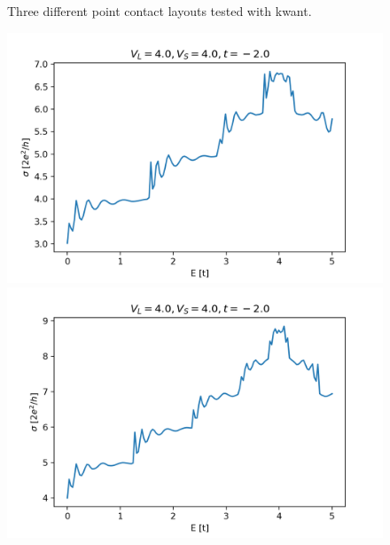 \documentclass[12pt]{article}
\numberwithin{equation}{section}
\begin{document}
\begin{figure}
\begin{minipage}{0.333\textwidth}
  \end{minipage}
  \caption{Three different point contact layouts tested with kwant.}
\end{figure}


\newpage
\begin{figure}
  \centering
  \begin{minipage}{0.333\textwidth}
      \centering
      \includegraphics[width=1.0\textwidth]{./media/cond_2deg_W4_L10_VL4_0_VS4_0.png} %
  \end{minipage}\hfill
  \begin{minipage}{0.333\textwidth}
      \centering
      \includegraphics[width=1.0\textwidth]{./media/cond_2deg_W5_L10_VL4_0_VS4_0.png} %
  \end{minipage}\hfill
  \begin{minipage}{0.333\textwidth}

\end{minipage}
\end{figure}
\end{document}
